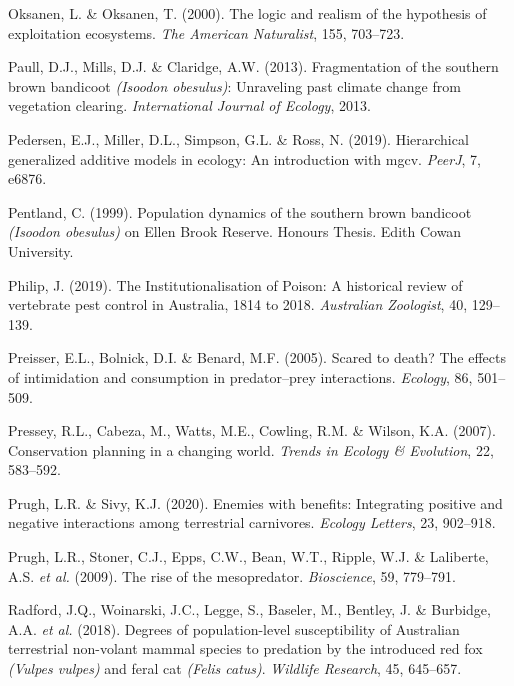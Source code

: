 \documentclass[11pt,a4paper,titlepage,twoside,openright]{style/unimelbthesis}
\begin{document}
\begin{mainmatter}
\leavevmode\hypertarget{ref-oksanen2000logic}{}%
Oksanen, L. \& Oksanen, T. (2000). The logic and realism of the hypothesis of exploitation ecosystems. \emph{The American Naturalist}, 155, 703--723.

\leavevmode\hypertarget{ref-paull2013fragmentation}{}%
Paull, D.J., Mills, D.J. \& Claridge, A.W. (2013). Fragmentation of the southern brown bandicoot \emph{(Isoodon obesulus)}: Unraveling past climate change from vegetation clearing. \emph{International Journal of Ecology}, 2013.

\leavevmode\hypertarget{ref-pedersen2019hierarchical}{}%
Pedersen, E.J., Miller, D.L., Simpson, G.L. \& Ross, N. (2019). Hierarchical generalized additive models in ecology: An introduction with mgcv. \emph{PeerJ}, 7, e6876.

\leavevmode\hypertarget{ref-pentland1999population}{}%
Pentland, C. (1999). Population dynamics of the southern brown bandicoot \emph{(Isoodon obesulus)} on Ellen Brook Reserve. Honours Thesis. Edith Cowan University.

\leavevmode\hypertarget{ref-philip2019institutionalisation}{}%
Philip, J. (2019). The Institutionalisation of Poison: A historical review of vertebrate pest control in Australia, 1814 to 2018. \emph{Australian Zoologist}, 40, 129--139.

\leavevmode\hypertarget{ref-preisser2005scared}{}%
Preisser, E.L., Bolnick, D.I. \& Benard, M.F. (2005). Scared to death? The effects of intimidation and consumption in predator--prey interactions. \emph{Ecology}, 86, 501--509.

\leavevmode\hypertarget{ref-pressey2007conservation}{}%
Pressey, R.L., Cabeza, M., Watts, M.E., Cowling, R.M. \& Wilson, K.A. (2007). Conservation planning in a changing world. \emph{Trends in Ecology \& Evolution}, 22, 583--592.

\leavevmode\hypertarget{ref-prugh2020enemies}{}%
Prugh, L.R. \& Sivy, K.J. (2020). Enemies with benefits: Integrating positive and negative interactions among terrestrial carnivores. \emph{Ecology Letters}, 23, 902--918.

\leavevmode\hypertarget{ref-prugh2009rise}{}%
Prugh, L.R., Stoner, C.J., Epps, C.W., Bean, W.T., Ripple, W.J. \& Laliberte, A.S. \emph{et al.} (2009). The rise of the mesopredator. \emph{Bioscience}, 59, 779--791.

\leavevmode\hypertarget{ref-radford2018degrees}{}%
Radford, J.Q., Woinarski, J.C., Legge, S., Baseler, M., Bentley, J. \& Burbidge, A.A. \emph{et al.} (2018). Degrees of population-level susceptibility of Australian terrestrial non-volant mammal species to predation by the introduced red fox \emph{(Vulpes vulpes)} and feral cat \emph{(Felis catus)}. \emph{Wildlife Research}, 45, 645--657.


\end{mainmatter}
\end{document}
